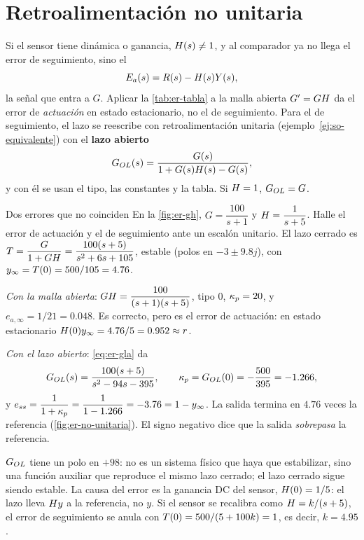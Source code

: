 \section{Retroalimentación no unitaria}
\label{sec:er-no-unitaria}

Si el sensor tiene dinámica o ganancia, $H(s)\neq1$, y al comparador ya no llega el error de seguimiento, sino el 
\[
  E_a(s)=R(s)-H(s)Y(s),
\]
la señal que entra a $G$. Aplicar la \cref{tab:er-tabla} a la malla abierta $G'=GH$ da el error de \emph{actuación} en estado estacionario, no el de seguimiento. Para el de seguimiento, el lazo se reescribe con retroalimentación unitaria (ejemplo~\ref{ej:so-equivalente}) con el \textbf{lazo abierto}
\begin{equation}
  G_{OL}(s)=\frac{G(s)}{1+G(s)H(s)-G(s)},
  \label{eq:er-gla}
\end{equation}
y con él se usan el tipo, las constantes y la tabla. Si $H=1$, $G_{OL}=G$.

\begin{ejemplo}[label=ej:er-gh]{Dos errores que no coinciden}
En la \cref{fig:er-gh}, $G=\dfrac{100}{s+1}$ y $H=\dfrac{1}{s+5}$. Halle el error de actuación y el de seguimiento ante un escalón unitario.
\solucion El lazo cerrado es $T=\dfrac{G}{1+GH}=\dfrac{100(s+5)}{s^2+6s+105}$, estable (polos en $-3\pm9.8j$), con $y_\infty=T(0)=500/105=4.76$.

\emph{Con la malla abierta}: $GH=\dfrac{100}{(s+1)(s+5)}$, tipo 0, $\kappa_p=20$, y $e_{a,\infty}=1/21=0.048$. Es correcto, pero es el error de actuación: en estado estacionario $H(0)y_\infty=4.76/5=0.952\approx r$.

\emph{Con el lazo abierto}: \eqref{eq:er-gla} da
\[
  G_{OL}(s)=\frac{100(s+5)}{s^2-94s-395},\qquad \kappa_p=G_{OL}(0)=-\frac{500}{395}=-1.266,
\]
y $e_{ss}=\dfrac{1}{1+\kappa_p}=\dfrac{1}{1-1.266}=-3.76=1-y_\infty$. La salida termina en $4.76$ veces la referencia (\cref{fig:er-no-unitaria}). El signo negativo dice que la salida \emph{sobrepasa} la referencia.

$G_{OL}$ tiene un polo en $+98$: no es un sistema físico que haya que estabilizar, sino una función auxiliar que reproduce el mismo lazo cerrado; el lazo cerrado sigue siendo estable. La causa del error es la ganancia DC del sensor, $H(0)=1/5$: el lazo lleva $H y$ a la referencia, no $y$. Si el sensor se recalibra como $H=k/(s+5)$, el error de seguimiento se anula con $T(0)=500/(5+100k)=1$, es decir, $k=4.95$.
\end{ejemplo}


